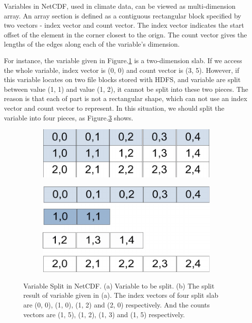 \documentclass[preprint,12pt]{elsarticle}
\begin{document}
Variables in NetCDF, used in climate data, can be viewed as multi-dimension array. An array section is defined as a contiguous rectangular
block specified by two vectors - index vector and count vector. The index vector indicates the start offset of the element in the corner
closest to the orign. The count vector gives the lengths of the edges along each of the variable's dimension. \par
For instance, the variable given in Figure.\ref{figure4a} is a two-dimension slab. If we access the whole variable, index vector is (0, 0) 
and count vector is (3, 5). However, if this variable locates on two file blocks stored with HDFS, and variable are split between value 
(1, 1) and value (1, 2), it cannot be split into these two pieces. The reason is that each of part is not a rectangular shape, which 
can not use an index vector and count vector to represent. In this situation, we should split the variable into four pieces, as 
Figure.\ref{figure4b} shows.

\begin{figure}[htb]
    \centering
    \begin{subfigure}{.5\textwidth}
        \includegraphics[width=\textwidth]{figure4a}
        \caption{}
        \label{figure4a}
    \end{subfigure}

    \begin{subfigure}{\textwidth}
        \centering
        \includegraphics[width=.5\textwidth]{figure4b}%
        \caption{}
        \label{figure4b}
    \end{subfigure}
    \caption{Variable Split in NetCDF. (a) Variable to be split. (b) The split result of variable given in (a). The index vectors of four
            split slab are (0, 0), (1, 0), (1, 2) and (2, 0) respectively. And the counts vectors are (1, 5), (1, 2), (1, 3) and (1, 5) 
            respectively.}
\end{figure}
\end{document}
